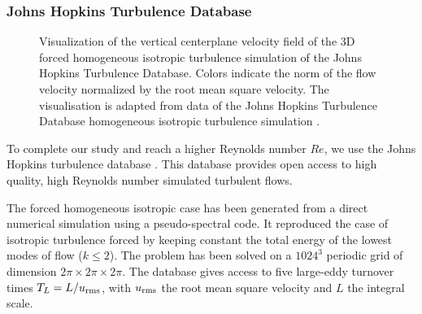 \subsubsection{Johns Hopkins Turbulence Database}

\begin{figure}
	\centering
	\def\svgwidth{0.6\textwidth}
	
  	\caption[Visualization of the vertical centerplane velocity field of the 3D forced homogeneous isotropic turbulence simulation of the Johns Hopkins Turbulence Database.]{
  		Visualization of the vertical centerplane velocity field of the 3D forced homogeneous isotropic turbulence simulation of the Johns Hopkins Turbulence Database.
  		Colors indicate the norm of the flow velocity normalized by the root mean square velocity.
  		The visualisation is adapted from data of the Johns Hopkins Turbulence Database homogeneous isotropic turbulence simulation \citep{li2008public, perlman2007data}.
  	}
  	\label{fig:jhtdb_visualization}
\end{figure}
To complete our study and reach a higher Reynolds number $Re$, we use the Johns Hopkins turbulence database \citep{li2008public, perlman2007data}.
This database provides open access to high quality, high Reynolds number simulated turbulent flows.

The forced homogeneous isotropic case has been generated from a direct numerical simulation using a pseudo-spectral code.
It reproduced the case of isotropic turbulence forced by keeping constant the total energy of the lowest modes of flow ($k \le 2$).
The problem has been solved on a $1024^3$ periodic grid of dimension $2 \pi \times 2 \pi \times 2 \pi$.
The database gives access to five large-eddy turnover times $T_{L} = L / u_{\mathrm{rms}}$, with $u_{\mathrm{rms}}$ the root mean square velocity and $L$ the integral scale.

